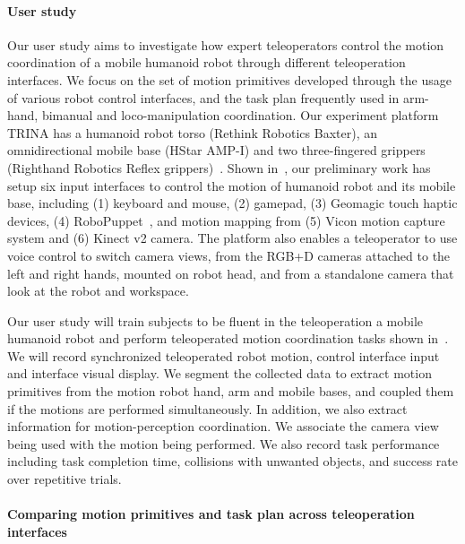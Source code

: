 \paragraph{User study} Our user study aims to investigate how expert teleoperators control the motion coordination of a mobile humanoid robot through different teleoperation interfaces. We focus on the set of motion primitives developed through the usage of various robot control interfaces, and the task plan frequently used in arm-hand, bimanual and loco-manipulation coordination. Our experiment platform TRINA has a humanoid robot torso (Rethink Robotics Baxter), an omnidirectional mobile base (HStar AMP-I) and two three-fingered grippers (Righthand Robotics Reflex grippers)~\cite{Li2017}. Shown in~, our preliminary work has setup six input interfaces to control the motion of humanoid robot and its mobile base, including (1) keyboard and mouse, (2) gamepad, (3) Geomagic touch haptic devices, (4) RoboPuppet~\cite{}, and motion mapping from (5) Vicon motion capture system and (6) Kinect v2 camera. The platform also enables a teleoperator to use voice control to switch camera views, from the RGB+D cameras attached to the left and right hands, mounted on robot head, and from a standalone camera that look at the robot and workspace. 

Our user study will train subjects to be fluent in the teleoperation a mobile humanoid robot and perform teleoperated motion coordination tasks shown in~. We will record synchronized teleoperated robot motion, control interface input and interface visual display. We segment the collected data to extract motion primitives from the motion robot hand, arm and mobile bases, and coupled them if the motions are performed simultaneously. In addition, we also extract information for motion-perception coordination. We associate the camera view being used with the motion being performed. We also record task performance including task completion time, collisions with unwanted objects, and success rate over repetitive trials. 

\paragraph{Comparing motion primitives and task plan across teleoperation interfaces}


